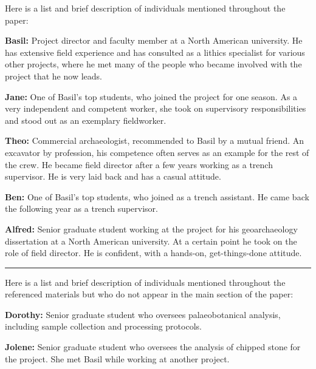 \documentclass{article}
\begin{document}
Here is a list and brief description of individuals mentioned throughout the paper:\newline

\noindent\textbf{Basil:} Project director and faculty member at a North American
university. He has extensive field experience and has consulted as a
lithics specialist for various other projects, where he met many of the
people who became involved with the project that he now leads.\newline

\noindent\textbf{Jane:} One of Basil's top students, who joined the project for
one season. As a very independent and competent worker, she took on
supervisory responsibilities and stood out as an exemplary fieldworker.\newline

\noindent\textbf{Theo:} Commercial archaeologist, recommended to Basil by a
mutual friend. An excavator by profession, his competence often serves
as an example for the rest of the crew. He became field director after a
few years working as a trench supervisor. He is very laid back and has a
casual attitude.\newline

\noindent\textbf{Ben:} One of Basil's top students, who joined as a trench
assistant. He came back the following year as a trench supervisor.\newline

\noindent\textbf{Alfred:} Senior graduate student working at the project for his
geoarchaeology dissertation at a North American university. At a certain
point he took on the role of field director. He is confident, with a
hands-on, get-things-done attitude.\newline

\noindent\begin{center}\rule{0.5\linewidth}{0.5pt}\end{center}

\noindent Here is a list and brief description of individuals mentioned throughout the referenced materials but who do not appear in the main section of the paper:\newline

\noindent\textbf{Dorothy:} Senior graduate student who oversees palaeobotanical
analysis, including sample collection and processing protocols.\newline

\noindent\textbf{Jolene:} Senior graduate student who oversees the analysis of
chipped stone for the project. She met Basil while working at another
project.\newline
\end{document}
